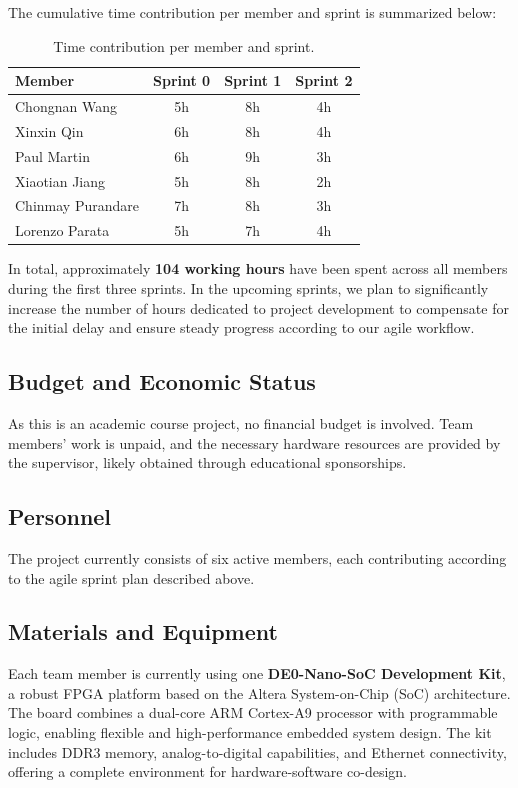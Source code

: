 \documentclass[10pt]{article}
\begin{document}
The cumulative time contribution per member and sprint is summarized below:

\begin{table}[h!]
\centering
\begin{tabular}{lccc}
\hline
\textbf{Member} & \textbf{Sprint 0} & \textbf{Sprint 1} & \textbf{Sprint 2} \\
\hline
Chongnan Wang & 5h & 8h & 4h \\
Xinxin Qin & 6h & 8h & 4h \\
Paul Martin & 6h & 9h & 3h \\
Xiaotian Jiang & 5h & 8h & 2h \\
Chinmay Purandare & 7h & 8h & 3h \\
Lorenzo Parata & 5h & 7h & 4h \\
\hline
\end{tabular}
\caption{Time contribution per member and sprint.}
\end{table}

In total, approximately \textbf{104 working hours} have been spent across all members during the first three sprints. In the upcoming sprints, we plan to significantly increase the number of hours dedicated to project development to compensate for the initial delay and ensure steady progress according to our agile workflow.

\subsection{Budget and Economic Status}
As this is an academic course project, no financial budget is involved. Team members’ work is unpaid, and the necessary hardware resources are provided by the supervisor, likely obtained through educational sponsorships.

\subsection{Personnel}
The project currently consists of six active members, each contributing according to the agile sprint plan described above.

\subsection{Materials and Equipment}
Each team member is currently using one \textbf{DE0-Nano-SoC Development Kit}, a robust FPGA platform based on the Altera System-on-Chip (SoC) architecture. The board combines a dual-core ARM Cortex-A9 processor with programmable logic, enabling flexible and high-performance embedded system design. The kit includes DDR3 memory, analog-to-digital capabilities, and Ethernet connectivity, offering a complete environment for hardware-software co-design.
\end{document}
